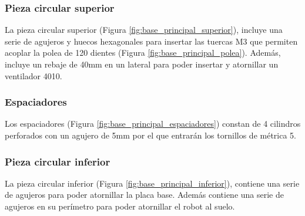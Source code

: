 \subsubsection{Pieza circular superior}
\noindent La pieza circular superior (Figura \ref{fig:base_principal_superior}), incluye una serie de agujeros y huecos hexagonales para insertar las tuercas M3 que permiten
acoplar la polea de 120 dientes (Figura \ref{fig:base_principal_polea}). Además, incluye un rebaje de 40mm en un lateral para poder insertar y atornillar un ventilador 4010.
\subsubsection{Espaciadores}
\noindent Los espaciadores (Figura \ref{fig:base_principal_espaciadores}) constan de 4 cilindros perforados con un agujero de 5mm por el que entrarán los tornillos de métrica 5.
\subsubsection{Pieza circular inferior}
\noindent La pieza circular inferior (Figura \ref{fig:base_principal_inferior}), contiene una serie de agujeros para poder atornillar la placa base. Además contiene una serie de agujeros en su perímetro 
para poder atornillar el robot al suelo. 

